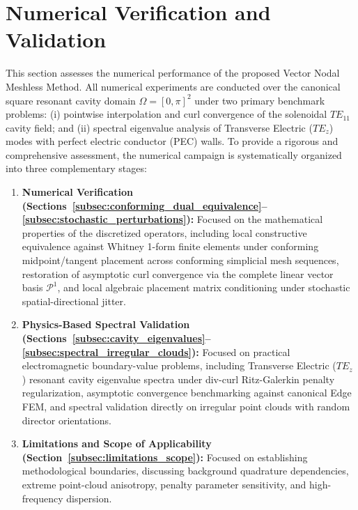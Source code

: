 \documentclass[preprint,12pt]{elsarticle}
\begin{document}
\section{Numerical Verification and Validation}
\label{sec:numerical_results}

This section assesses the numerical performance of the proposed Vector Nodal Meshless Method. All numerical experiments are conducted over the canonical square resonant cavity domain $\Omega = [0, \pi]^2$ under two primary benchmark problems: (i) pointwise interpolation and curl convergence of the solenoidal $TE_{11}$ cavity field; and (ii) spectral eigenvalue analysis of Transverse Electric ($TE_z$) modes with perfect electric conductor (PEC) walls. To provide a rigorous and comprehensive assessment, the numerical campaign is systematically organized into three complementary stages:
\begin{enumerate}
    \item \textbf{Numerical Verification (Sections~\ref{subsec:conforming_dual_equivalence}--\ref{subsec:stochastic_perturbations}):} Focused on the mathematical properties of the discretized operators, including local constructive equivalence against Whitney 1-form finite elements under conforming midpoint/tangent placement across conforming simplicial mesh sequences, restoration of asymptotic curl convergence via the complete linear vector basis $\mathcal{P}^1$, and local algebraic placement matrix conditioning under stochastic spatial-directional jitter.
    \item \textbf{Physics-Based Spectral Validation (Sections~\ref{subsec:cavity_eigenvalues}--\ref{subsec:spectral_irregular_clouds}):} Focused on practical electromagnetic boundary-value problems, including Transverse Electric ($TE_z$) resonant cavity eigenvalue spectra under div-curl Ritz-Galerkin penalty regularization, asymptotic convergence benchmarking against canonical Edge FEM, and spectral validation directly on irregular point clouds with random director orientations.
    \item \textbf{Limitations and Scope of Applicability (Section~\ref{subsec:limitations_scope}):} Focused on establishing methodological boundaries, discussing background quadrature dependencies, extreme point-cloud anisotropy, penalty parameter sensitivity, and high-frequency dispersion.
\end{enumerate}
\end{document}
